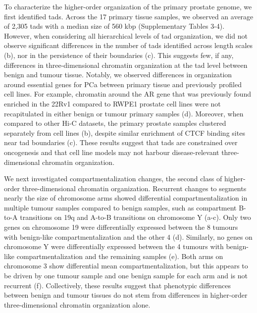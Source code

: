 To characterize the higher-order organization of the primary prostate genome, we first identified \glspl{tad}.
Across the 17 primary tissue samples, we observed an average of 2,305 \glspl{tad} with a median size of 560 kbp (Supplementary Tables 3-4).
However, when considering all hierarchical levels of \gls{tad} organization, we did not observe significant differences in the number of \glspl{tad} identified across length scales (b), nor in the persistence of their boundaries (c).
This suggests few, if any, differences in three-dimensional chromatin organization at the \gls{tad} level between benign and tumour tissue.
Notably, we observed differences in organization around essential genes for PCa between primary tissue and previously profiled cell lines.
For example, chromatin around the AR gene that was previously found enriched in the 22Rv1 compared to RWPE1 prostate cell lines \cite{rhieHighresolution3DEpigenomic2019} were not recapitulated in either benign or tumour primary samples (d).
Moreover, when compared to other Hi-C datasets, the primary prostate samples clustered separately from cell lines (b), despite similar enrichment of CTCF binding sites near \gls{tad} boundaries (c).
These results suggest that \glspl{tad} are constrained over oncogenesis and that cell line models may not harbour disease-relevant three-dimensional chromatin organization.

We next investigated compartmentalization changes, the second class of higher-order three-dimensional chromatin organization.
Recurrent changes to segments nearly the size of chromosome arms showed differential compartmentalization in multiple tumour samples compared to benign samples, such as compartment B-to-A transitions on 19q and A-to-B transitions on chromosome Y (a-c).
Only two genes on chromosome 19 were differentially expressed between the 8 tumours with benign-like compartmentalization and the other 4 (d).
Similarly, no genes on chromosome Y were differentially expressed between the 4 tumours with benign-like compartmentalization and the remaining samples (e).
Both arms on chromosome 3 show differential mean compartmentalization, but this appears to be driven by one tumour sample and one benign sample for each arm and is not recurrent (f).
Collectively, these results suggest that phenotypic differences between benign and tumour tissues do not stem from differences in higher-order three-dimensional chromatin organization alone.

